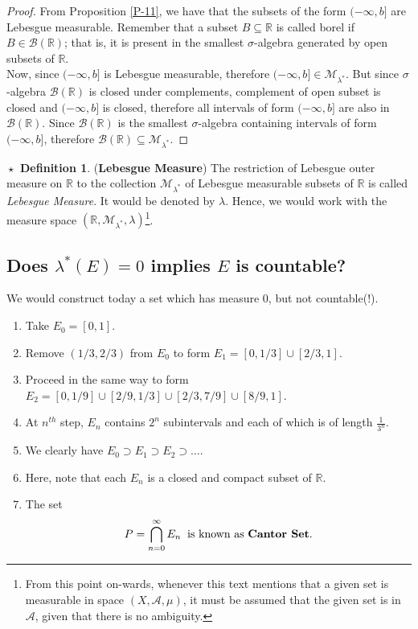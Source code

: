 \documentclass{article}
\theoremstyle{definition}
\newtheorem{definition}{$\boxed{\star}$ Definition}
\theoremstyle{remark}
\theoremstyle{definition}
\theoremstyle{definition}
\theoremstyle{definition}
\newcommand{\union}{\cup}
\newcommand{\bintrs}{\bigcap}
\newcommand{\R}{\mathbb{R}}
\newcommand{\alg}[1]{\mathscr{#1}}
\newcommand{\bor}[1]{\mathscr{B}(#1)}
\newcommand{\lom}[1]{\lambda^*\left (#1\right )}
\newcommand{\set}[1]{\mathscr{#1}}
\newcommand{\msigm}[1]{\set{M}_{#1}}
\begin{document}
\begin{proof}
	From Proposition \ref{P-11}, we have that the subsets of the form $ (-\infty,b] $ are Lebesgue measurable. Remember that a subset $ B\subseteq \R $ is called borel if $ B\in \bor{\R} $; that is, it is present in the smallest $ \sigma $-algebra generated by open subsets of $ \R $. \\
	Now, since $ (-\infty,b] $ is Lebesgue measurable, therefore $ (-\infty,b] \in \msigm{\lambda^*} $. But since $ \sigma $-algebra $ \bor{\R} $ is closed under complements, complement of open subset is closed and $ (-\infty,b] $ is closed, therefore all intervals of form $ (-\infty,b] $ are also in $ \bor{\R} $. Since $ \bor{\R} $ is the smallest $ \sigma $-algebra containing intervals of form $ (-\infty,b] $, therefore $ \bor{\R} \subseteq \msigm{\lambda^*} $.
\end{proof}
\hrulefill
\newpage
\begin{definition}
	(\textbf{Lebesgue Measure}) The restriction of Lebesgue outer measure on $ \R $ to the collection $ \msigm{\lambda^*} $ of Lebesgue measurable subsets of $ \R $ is called \emph{Lebesgue Measure}. It would be denoted by $ \lambda $. Hence, we would work with the measure space $ (\R,\msigm{\lambda^*},\lambda) $\footnote{From this point on-wards, whenever this text mentions that a given set is measurable in space $ (X,\alg{A},\mu) $, it must be assumed that the given set is in $ \alg{A} $, given that there is no ambiguity.}.
\end{definition}
\hrulefill
\subsection{Does $ \lom{E} = 0 $ implies $ E $ is countable?}
We would construct today a set which has measure 0, but not countable(!).
\begin{enumerate}
	\item {Take $ E_0 = [0,1] $.}
	\item {Remove $ (1/3,2/3) $ from $ E_0 $ to form $ E_1 = [0,1/3] \union [2/3,1] $.}
	\item {Proceed in the same way to form $ E_2 = [0,1/9]\union [2/9,1/3] \union [2/3,7/9]\union [8/9,1] $.}
	\item {At $ n^{th} $ step, $ E_n $ contains $ 2^n $ subintervals and each of which is of length $ \frac{1}{3^n} $.}
	\item {We clearly have $ E_0 \supset E_1 \supset E_2 \supset \dots $.}
	\item {Here, note that each $ E_n $ is a closed and compact subset of $ \R $.}
	\item {The set 
\[P = \bintrs_{n=0}^{\infty} E_n \;\;\text{is known as \textbf{Cantor Set}.}\]	
}
\end{enumerate}
\end{document}
